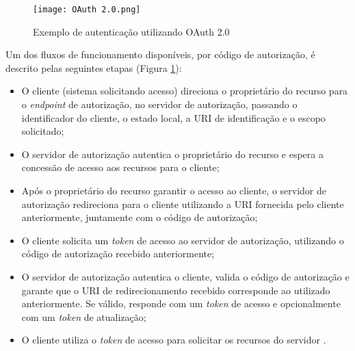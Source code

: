 \begin{figure}[ht]
    \centering
    \texttt{[image: OAuth 2.0.png]}
    \caption{Exemplo de autenticação utilizando OAuth 2.0}
    \label{fig:OAuth2}
\end{figure}

Um dos fluxos de funcionamento 
disponíveis, por código de autorização, é descrito pelas seguintes etapas (Figura \ref{fig:OAuth2}):

\begin{itemize}
\item O cliente (sistema solicitando acesso) direciona o proprietário do recurso para o \emph{endpoint} de autorização, no servidor
de autorização, passando o identificador do cliente, o estado local, a URI de identificação e o 
escopo solicitado;
\item O servidor de autorização autentica o proprietário do recurso e espera a concessão de acesso 
aos recursos para o cliente;
\item Após o proprietário do recurso garantir o acesso ao cliente, o servidor de autorização 
redireciona para o cliente utilizando a URI fornecida pelo cliente anteriormente, juntamente com o 
código de autorização;
\item O cliente solicita um \emph{token} de acesso ao servidor de autorização, utilizando o código
de autorização recebido anteriormente;
\item O servidor de autorização autentica o cliente, valida o código de autorização e garante que o 
URI de redirecionamento recebido corresponde ao utilizado anteriormente. Se válido, responde com um 
\emph{token} de acesso e opcionalmente com um \emph{token} de atualização;
\item O cliente utiliza o \emph{token} de acesso para solicitar os recursos do servidor \cite{RFC6749}.
\end{itemize}
